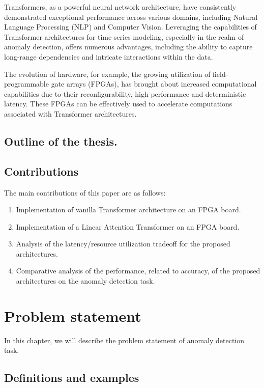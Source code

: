 \documentclass[a4paper, twoside]{report}
\theoremstyle{definition}
\numberwithin{equation}{section}
\begin{document}
Transformers, as a powerful neural network architecture, have consistently
demonstrated exceptional performance across various domains, including Natural Language
Processing (NLP) and Computer Vision. Leveraging the capabilities of Transformer
architectures for time series modeling, especially in the realm of anomaly detection, offers
numerous advantages, including the ability to capture long-range dependencies and
intricate interactions within the data.

The evolution of hardware, for example, the growing utilization of
field-programmable gate arrays (FPGAs), has brought about increased computational capabilities
due to their reconfigurability, high performance and deterministic latency. These FPGAs can be
effectively used to accelerate computations associated with Transformer
architectures.


\section*{Outline of the thesis.}



\section*{Contributions}

The main contributions of this paper are as follows:
\begin{enumerate}
    \item Implementation of vanilla Transformer architecture on an FPGA board.
    \item Implementation of a Linear Attention Transformer on an FPGA board.
    \item Analysis of the latency/resource utilization tradeoff for the proposed architectures.
    \item Comparative analysis of the performance, related to accuracy, of the proposed architectures on the anomaly detection task.
\end{enumerate}



\chapter{Problem statement}

In this chapter, we will describe the problem statement of anomaly detection task.

\section{Definitions and examples}
\end{document}
